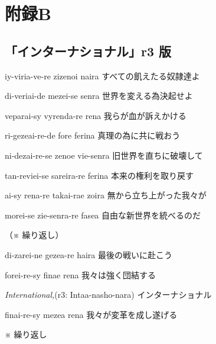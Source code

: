 \section{附録B}

\subsection{「インターナショナル」r3 版}

\lyric
{iy-viria-ve-re zizenoi naira}
{すべての飢えたる奴隷達よ}

\lyric
{di-veriai-de mezei-se senra}
{世界を変える為決起せよ}

\lyric
{veparai-sy vyrenda-re rena}
{我らが血が訴えかける}

\lyric
{ri-gezeai-re-de fore ferina}
{真理の為に共に戦おう}

\lyric
{ni-dezai-re-se zenoe vie-senra}
{旧世界を直ちに破壊して}

\lyric
{tan-reviei-se sareira-re ferina}
{本来の権利を取り戻す}

\lyric
{ai-sy rena-re takai-rae zoira}
{無から立ち上がった我々が}

\lyric
{morei-se zie-senra-re fasea}
{自由な新世界を統べるのだ}

（※ 繰り返し）

\lyric
{di-zarei-ne gezea-re haira}
{最後の戦いに赴こう}

\lyric
{forei-re-sy finae rena}
{我々は強く団結する}

\lyric
{\emph{International,}(r3: Intaa-nasho-nara)}
{インターナショナル}

\lyric
{finai-re-sy mezea rena}
{我々が変革を成し遂げる}

※ 繰り返し